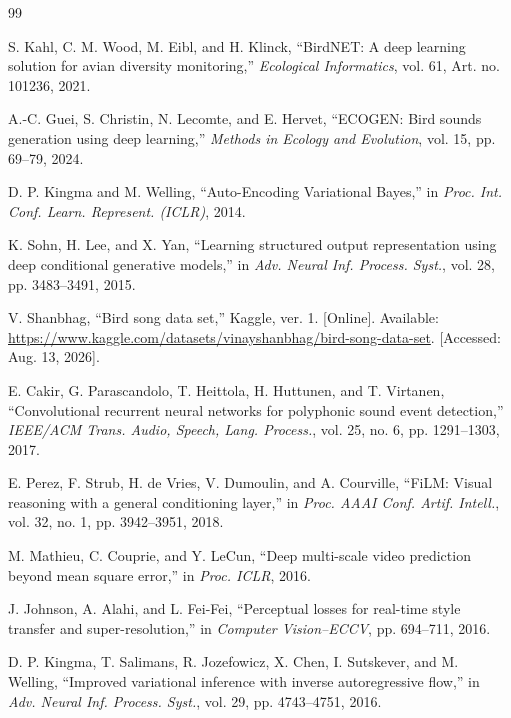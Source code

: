\documentclass{article}
\begin{document}
\clearpage
\begin{thebibliography}{99}
\small

S. Kahl, C. M. Wood, M. Eibl, and H. Klinck,
``BirdNET: A deep learning solution for avian diversity monitoring,''
\emph{Ecological Informatics}, vol. 61, Art. no. 101236, 2021.

A.-C. Guei, S. Christin, N. Lecomte, and E. Hervet,
``ECOGEN: Bird sounds generation using deep learning,''
\emph{Methods in Ecology and Evolution}, vol. 15, pp. 69--79, 2024.

D. P. Kingma and M. Welling, ``Auto-Encoding Variational Bayes,'' in
\emph{Proc. Int. Conf. Learn. Represent. (ICLR)}, 2014.

K. Sohn, H. Lee, and X. Yan, ``Learning structured output representation using
deep conditional generative models,'' in \emph{Adv. Neural Inf. Process.
Syst.}, vol. 28, pp. 3483--3491, 2015.

V. Shanbhag, ``Bird song data set,'' Kaggle, ver. 1. [Online]. Available:
\url{https://www.kaggle.com/datasets/vinayshanbhag/bird-song-data-set}.
[Accessed: Aug. 13, 2026].

E. Cakir, G. Parascandolo, T. Heittola, H. Huttunen, and T. Virtanen,
``Convolutional recurrent neural networks for polyphonic sound event
detection,'' \emph{IEEE/ACM Trans. Audio, Speech, Lang. Process.}, vol. 25,
no. 6, pp. 1291--1303, 2017.

E. Perez, F. Strub, H. de Vries, V. Dumoulin, and A. Courville, ``FiLM: Visual
reasoning with a general conditioning layer,'' in \emph{Proc. AAAI Conf.
Artif. Intell.}, vol. 32, no. 1, pp. 3942--3951, 2018.

M. Mathieu, C. Couprie, and Y. LeCun, ``Deep multi-scale video prediction
beyond mean square error,'' in \emph{Proc. ICLR}, 2016.

J. Johnson, A. Alahi, and L. Fei-Fei, ``Perceptual losses for real-time style
transfer and super-resolution,'' in \emph{Computer Vision--ECCV}, pp.
694--711, 2016.

D. P. Kingma, T. Salimans, R. Jozefowicz, X. Chen, I. Sutskever, and M.
Welling, ``Improved variational inference with inverse autoregressive flow,''
in \emph{Adv. Neural Inf. Process. Syst.}, vol. 29, pp. 4743--4751, 2016.


\end{thebibliography}
\end{document}
